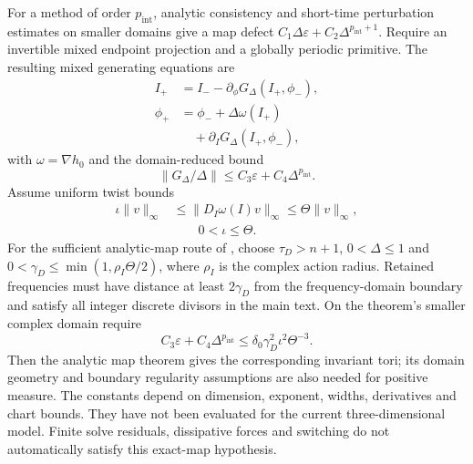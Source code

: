 For a method of order $p_{\mathrm{int}}$, analytic consistency and short-time perturbation estimates on smaller domains give a map defect $C_1\Delta\varepsilon+C_2\Delta^{p_{\mathrm{int}}+1}$. Require an invertible mixed endpoint projection and a globally periodic primitive. The resulting mixed generating equations are
\begin{equation}
 \begin{aligned}
 I_+&=I_--\partial_\phi G_\Delta(I_+,\phi_-),\\
 \phi_+&=\phi_-+\Delta\omega(I_+)\\
 &\quad+\partial_I G_\Delta(I_+,\phi_-),
 \end{aligned}
 \label{eq:supp-learn-discrete-generator}
\end{equation}
with $\omega=\nabla h_0$ and the domain-reduced bound
\begin{equation}
 \|G_\Delta/\Delta\|\le C_3\varepsilon+C_4\Delta^{p_{\mathrm{int}}}.
 \label{eq:supp-learn-discrete-budget}
\end{equation}
Assume uniform twist bounds
\begin{equation}
 \begin{aligned}
 \iota\|v\|_\infty&\le\|D_I\omega(I)v\|_\infty\le\Theta\|v\|_\infty,\\
 &\qquad 0<\iota\le\Theta.
 \end{aligned}
 \label{eq:supp-learn-discrete-twist}
\end{equation}
For the sufficient analytic-map route of \citet{Shang1999}, choose $\tau_D>n+1$, $0<\Delta\le1$ and $0<\gamma_D\le\min(1,\rho_I\Theta/2)$, where $\rho_I$ is the complex action radius. Retained frequencies must have distance at least $2\gamma_D$ from the frequency-domain boundary and satisfy all integer discrete divisors in the main text. On the theorem's smaller complex domain require
\begin{equation}
 C_3\varepsilon+C_4\Delta^{p_{\mathrm{int}}}
 \le\delta_0\gamma_D^2\iota^2\Theta^{-3}.
 \label{eq:supp-learn-discrete-threshold}
\end{equation}
Then the analytic map theorem gives the corresponding invariant tori; its domain geometry and boundary regularity assumptions are also needed for positive measure. The constants depend on dimension, exponent, widths, derivatives and chart bounds. They have not been evaluated for the current three-dimensional model. Finite solve residuals, dissipative forces and switching do not automatically satisfy this exact-map hypothesis.


